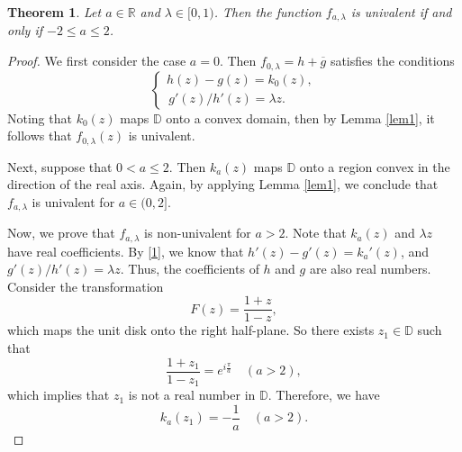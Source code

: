 \documentclass[11pt, reqno]{amsart}
\newtheorem{theorem}{Theorem}
\newtheorem{lemma}{Lemma}
\numberwithin{equation}{section}
\newcommand{\R}{\mbox{$\mathbb{R}$}}
\newcommand{\D}{\mbox{$\mathbb{D}$}}
\begin{document}

	\begin{theorem}\label{T1}
	Let $a\in\R$ and $\lambda\in[0,1)$. Then the function $f_{a,\lambda}$ is univalent if and only if  $-2\leq a\leq2$. 
\end{theorem}
\begin{proof}
	We first consider the case $a=0$. Then $f_{0,\lambda}=h+\overline{g}$ satisfies the conditions  
	\begin{equation*}\label{T1-1}
		\begin{cases}
			h(z)-g(z)=k_0(z),\\
			\,{g'(z)}/{h'(z)}=\lambda z.
		\end{cases}
	\end{equation*}
Noting that $k_0(z)$ maps $\D$ onto a convex domain,
   then by Lemma \ref{lem1}, it follows that $f_{0,\lambda}(z)$ is univalent. %
    
   Next, suppose that $0<a\leq 2$. Then $k_a(z)$ maps $\D$ onto a region convex in the direction of the real axis.  Again, by applying Lemma \ref{lem1}, we conclude that $f_{a,\lambda}$ is univalent for $a\in(0,2]$. 
    
	Now, we prove that $f_{a,\lambda}$ is non-univalent  for $a>2$.  Note that $k_a(z)$ and $\lambda z$ have real coefficients. By \eqref{1}, we know that $h'(z)-g'(z)=k_a'(z)$, and ${g'(z)}/{h'(z)}=\lambda z$. Thus, the coefficients of $h$ and $g$ are also real numbers. 
    Consider the transformation 
    $$F(z)=\dfrac{1+z}{1-z},$$
    which maps the unit disk onto the right half-plane. %
    So there exists $z_1\in\D$ such that
    \begin{equation*}\label{T1-2}
        \dfrac{1+z_1}{1-z_1}=e^{i\frac{\pi}{a}}\quad(a>2),
    \end{equation*}
    which implies that $z_1$ is not a real number in $\D$.
    Therefore, we have 
    \begin{equation}\label{T1-3}
        k_a(z_1)=-\dfrac{1}{a}\quad(a>2).
    \end{equation}
    

\end{proof}
\end{document}

